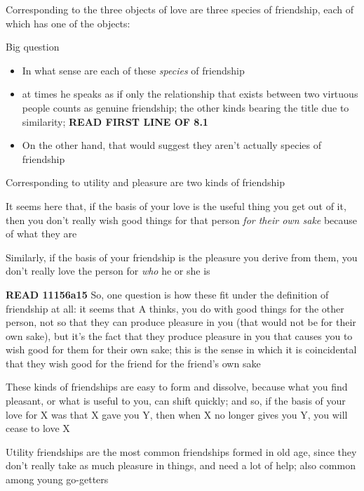 \documentclass[11pt]{article}
\begin{document}
\noindent Corresponding to the three objects of love are three species of friendship, each of which has one of the objects: 
\vspace*{2mm}

\noindent Big question

\begin{itemize}\item{In what sense are each of these \emph{species} of friendship}\item{at times he speaks as if only the relationship that exists between two virtuous people counts as genuine friendship; the other kinds bearing the title due to similarity; \textbf{READ FIRST LINE OF 8.1}}\item{On the other hand, that would suggest they aren't actually species of friendship}\end{itemize}

\noindent Corresponding to utility and pleasure are two kinds of friendship
\vspace*{2mm}

\noindent It seems here that, if the basis of your love is the useful thing you get out of it, then you don't really wish good things for that person \emph{for their own sake} because of what they are
\vspace*{2mm}

\noindent Similarly, if the basis of your friendship is the pleasure you derive from them, you don't really love the person for \emph{who} he or she is
\vspace*{2mm}

\noindent \textbf{READ 11156a15} So, one question is how these fit under the definition of friendship at all: it seems that A thinks, you do with good things for the other person, not so that they can produce pleasure in you (that would not be for their own sake), but it's the fact that they produce pleasure in you that causes you to wish good for them for their own sake; this is the sense in which it is coincidental that they wish good for the friend for the friend's own sake
\vspace*{2mm}

\noindent These kinds of friendships are easy to form and dissolve, because what you find pleasant, or what is useful to you, can shift quickly; and so, if the basis of your love for X was that X gave you Y, then when X no longer gives you Y, you will cease to love X
\vspace*{2mm}

\noindent Utility friendships are the most common friendships formed in old age, since they don't really take as much pleasure in things, and need a lot of help; also common among young go-getters
\vspace*{2mm}
\end{document}
